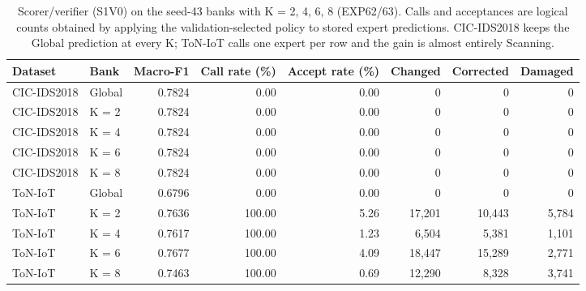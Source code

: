 \begin{table}[H]
\centering
\small
\caption{Scorer/verifier (S1V0) on the seed-43 banks with K = 2, 4, 6, 8 (EXP62/63). Calls and acceptances are logical counts obtained by applying the validation-selected policy to stored expert predictions. CIC-IDS2018 keeps the Global prediction at every K; ToN-IoT calls one expert per row and the gain is almost entirely Scanning.}
\label{tab:sv_by_k}
\begin{tabular}{llrrrrrr}
\toprule
Dataset & Bank & Macro-F1 & Call rate (\%) & Accept rate (\%) & Changed & Corrected & Damaged \\
\midrule
CIC-IDS2018 & Global & 0.7824 & 0.00 & 0.00 & 0 & 0 & 0 \\
CIC-IDS2018 & K = 2 & 0.7824 & 0.00 & 0.00 & 0 & 0 & 0 \\
CIC-IDS2018 & K = 4 & 0.7824 & 0.00 & 0.00 & 0 & 0 & 0 \\
CIC-IDS2018 & K = 6 & 0.7824 & 0.00 & 0.00 & 0 & 0 & 0 \\
CIC-IDS2018 & K = 8 & 0.7824 & 0.00 & 0.00 & 0 & 0 & 0 \\
ToN-IoT & Global & 0.6796 & 0.00 & 0.00 & 0 & 0 & 0 \\
ToN-IoT & K = 2 & 0.7636 & 100.00 & 5.26 & 17,201 & 10,443 & 5,784 \\
ToN-IoT & K = 4 & 0.7617 & 100.00 & 1.23 & 6,504 & 5,381 & 1,101 \\
ToN-IoT & K = 6 & 0.7677 & 100.00 & 4.09 & 18,447 & 15,289 & 2,771 \\
ToN-IoT & K = 8 & 0.7463 & 100.00 & 0.69 & 12,290 & 8,328 & 3,741 \\
\bottomrule
\end{tabular}
\end{table}
